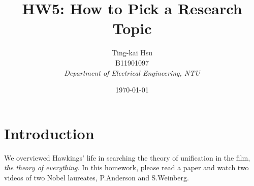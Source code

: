 \documentclass[12pt,a4paper]{article}
\title{HW5: How to Pick a Research Topic}
\author{
    Ting-kai Hsu\\
    B11901097\\
    \textit{Department of Electrical Engineering, NTU}
}
\date{\today}
\numberwithin{equation}{section}
\begin{document}
\maketitle

\tableofcontents
\section{Introduction}
We overviewed Hawkings' life in searching the theory of unification in the film, \textit{the theory of everything}. In this homework, please read a paper \cite{doi:10.1126/science.177.4047.393} and watch two videos of two Nobel laureates, P.Anderson and S.Weinberg.


\end{document}
